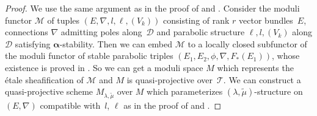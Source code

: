 \documentclass[pdftex]{sigma}
\numberwithin{equation}{section}
\newcommand{\balpha}{\boldsymbol \alpha}
\begin{document}
\begin{proof}
We use the same argument as in the proof of
\cite[Theorem 2.1]{Inaba-Saito} and
\cite[Theorem 2.1]{Inaba-2}.
Consider the moduli functor
${\mathcal M}$ of
tuples $(E,\nabla,l,\ell,(V_k))$ consisting of rank $r$ vector bundles~$E$,
connections $\nabla$ admitting poles along~${\mathcal D}$
and parabolic structure $\ell,l,(V_k)$ along ${\mathcal D}$
satisfying $\balpha$-stability.
Then we can embed ${\mathcal M}$ to a locally closed subfunctor of
the moduli functor of stable parabolic triples $(E_1,E_2,\phi,\nabla,F_*(E_1))$,
whose existence is proved in
\cite[Theorem~5.1]{IIS-1}.
So we can get a moduli space $M$ which represents the \'etale sheafification of
${\mathcal M}$ and $M$ is quasi-projective over~$\mathcal T$.
We can construct a quasi-projective scheme $M_{\lambda,\tilde{\mu}}$ over
$M$ which parameterizes $(\lambda,\tilde{\mu})$-structure on $(E,\nabla)$
compatible with~$l$, $\ell$
as in the proof of
\cite[Theorem~2.1]{Inaba-1}
and \cite[Theorem~2.1]{Inaba-Saito}.


\end{proof}
\end{document}
